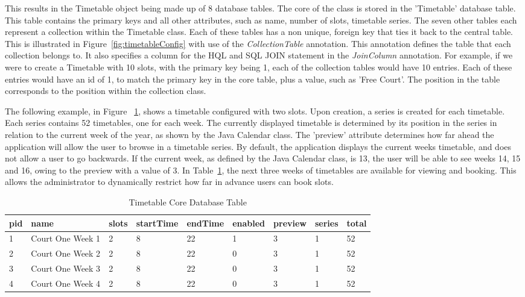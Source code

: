 This results in the Timetable object being made up of 8 database tables. The core of the class is stored in the 'Timetable' database table. This table contains the primary keys and all other attributes, such as name, number of slots, timetable series. The seven other tables each represent a collection within the Timetable class. Each of these tables has a non unique, foreign key that ties it back to the central table. This is illustrated in Figure~\ref{fig:timetableConfig} with use of the \textit{CollectionTable} annotation. This annotation defines the table that each collection belongs to. It also specifies a column for the HQL and SQL JOIN statement in the \textit{JoinColumn} annotation. For example, if we were to create a Timetable with 10 slots, with the primary key being 1, each of the collection tables would have 10 entries. Each of these entries would have an id of 1, to match the primary key in the core table, plus a value, such as 'Free Court'. The position in the table corresponds to the position within the collection class. 

The following example, in Figure ~\ref{fig:ttdb}, shows a timetable configured with two slots. Upon creation, a series is created for each timetable. Each series contains 52 timetables, one for each week. The currently displayed timetable is determined by its position in the series in relation to the current week of the year, as shown by the Java Calendar class. The 'preview' attribute determines how far ahead the application will allow the user to browse in a timetable series. By default, the application displays the current weeks timetable, and does not allow a user to go backwards. If the current week, as defined by the Java Calendar class, is 13, the user will be able to see weeks 14, 15 and 16, owing to the preview with a value of 3. In Table~\ref{fig:ttdb}, the next three weeks of timetables are available for viewing and booking. This allows the administrator to dynamically restrict how far in advance users can book slots.

\begin{table}[H]
	\caption{Timetable Core Database Table}
    \begin{tabular}{| l | l | l | l | l | l | l | l | p{.8cm} |}
    \hline
    pid & name & slots & startTime & endTime & enabled & preview & series & total\\ \hline
    1 & Court One Week 1 & 2 & 8 & 22 & 1 & 3 & 1 & 52\\ \hline
	2 & Court One Week 2 & 2 & 8 & 22 & 0 & 3 & 1 & 52\\ \hline
	3 & Court One Week 3 & 2 & 8 & 22 & 0 & 3 & 1 & 52\\ \hline
	4 & Court One Week 4 & 2 & 8 & 22 & 0 & 3 & 1 & 52\\ \hline
    \end{tabular}

	\label{fig:ttdb}
\end{table}

